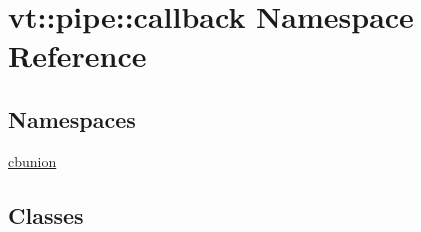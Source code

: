\hypertarget{namespacevt_1_1pipe_1_1callback}{}\section{vt\+:\+:pipe\+:\+:callback Namespace Reference}
\label{namespacevt_1_1pipe_1_1callback}
\subsection*{Namespaces}
\begin{DoxyCompactItemize}
\item 
 \hyperlink{namespacevt_1_1pipe_1_1callback_1_1cbunion}{cbunion}
\end{DoxyCompactItemize}
\subsection*{Classes}
